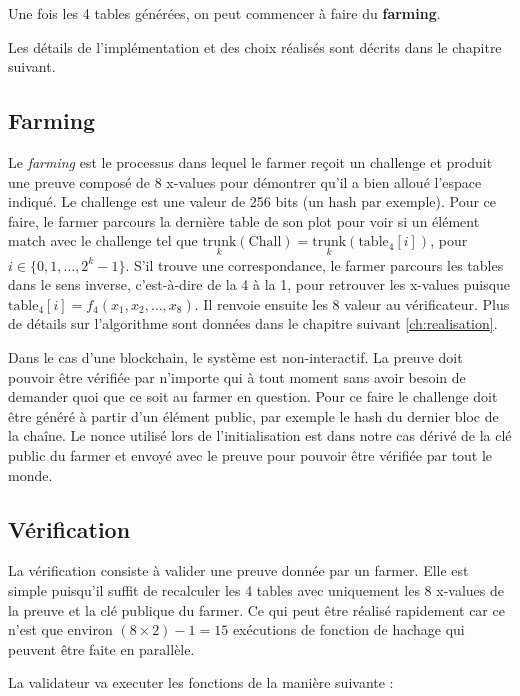 Une fois les 4 tables générées, on peut commencer à faire du \textbf{farming}.

Les détails de l'implémentation et des choix réalisés sont décrits dans le chapitre suivant.

\subsection{Farming}

Le \emph{farming} est le processus dans lequel le farmer reçoit un challenge et produit une preuve composé de 8 x-values pour démontrer qu'il a bien alloué l'espace indiqué. Le challenge est une valeur de 256 bits (un hash par exemple). Pour ce faire, le farmer parcours la dernière table de son plot pour voir si un élément match avec le challenge tel que $\underset{k}{\mathrm{trunk}}(\mathrm{Chall})=\underset{k}{\mathrm{trunk}}(\mathrm{table_4}[i])$, pour $i \in \{0,1,\dots,2^k-1\}$. S'il trouve une correspondance, le farmer parcours les tables dans le sens inverse, c'est-à-dire de la 4 à la 1, pour retrouver les x-values puisque $\mathrm{table_4}[i]=f_4(x_1,x_2,\dots,x_8)$. Il renvoie ensuite les 8 valeur au vérificateur. Plus de détails sur l'algorithme sont données dans le chapitre suivant \ref{ch:realisation}.

Dans le cas d'une blockchain, le système est non-interactif. La preuve doit pouvoir être vérifiée par n'importe qui à tout moment sans avoir besoin de demander quoi que ce soit au farmer en question. Pour ce faire le challenge doit être généré à partir d'un élément public, par exemple le hash du dernier bloc de la chaîne. Le nonce utilisé lors de l'initialisation est dans notre cas dérivé de la clé public du farmer et envoyé avec le preuve pour pouvoir être vérifiée par tout le monde.

\subsection{Vérification}

La vérification consiste à valider une preuve donnée par un farmer. Elle est simple puisqu'il suffit de recalculer les 4 tables avec uniquement les 8 x-values de la preuve et la clé publique du farmer. Ce qui peut être réalisé rapidement car ce n'est que environ $(8 \times 2) - 1 = 15$ exécutions de fonction de hachage qui peuvent être faite en parallèle.

La validateur va executer les fonctions de la manière suivante :

